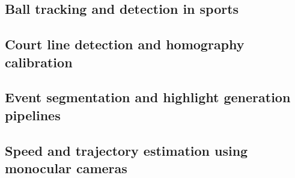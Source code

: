\subsection{Ball tracking and detection in sports}

\subsection{Court line detection and homography calibration}

\subsection{Event segmentation and highlight generation pipelines}

\subsection{Speed and trajectory estimation using monocular cameras}